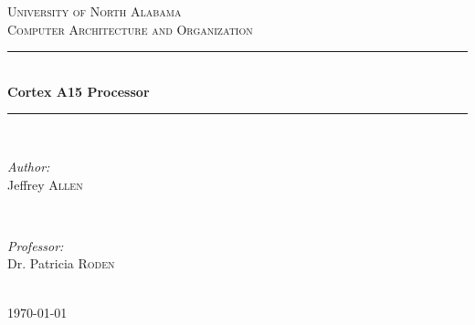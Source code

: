 \documentclass[12pt]{scrreprt}
\begin{document}
 

\begin{titlepage}

\newcommand{\HRule}{\rule{\linewidth}{0.5mm}} %

\center %


\textsc{\LARGE University of North Alabama}\\[1.5cm] %
\textsc{\Large Computer Architecture and Organization}\\[0.5cm] %


\HRule \\[0.4cm]
{ \huge \bfseries Cortex A15 Processor}\\[0.4cm] %
\HRule \\[1.5cm]
 

\begin{minipage}{0.4\textwidth}
\begin{flushleft} \large
\emph{Author:}\\
Jeffrey \textsc{Allen}
\end{flushleft}
\end{minipage}
~
\begin{minipage}{0.4\textwidth}
\begin{flushright} \large
\emph{Professor:} \\
Dr. Patricia \textsc{Roden}
\end{flushright}
\end{minipage}\\[4cm]

{\large \today}\\[3cm] %

\vfill %

\end{titlepage}
\end{document}
